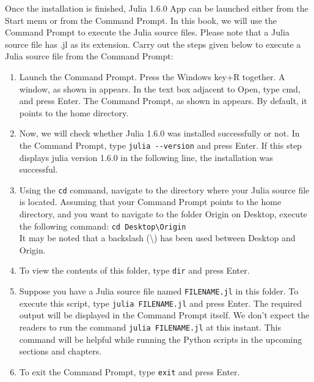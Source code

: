 Once the installation is finished, Julia 1.6.0 App can be launched either 
from the Start menu or from the Command Prompt. In this book, we will use the Command 
Prompt to execute the Julia source files. Please note that a Julia source file has .jl as its extension. 
Carry out the steps given below to execute a Julia source file from the Command Prompt:
\begin{enumerate}
      \item Launch the Command Prompt. Press the Windows key+R together. A window, as shown in  
      appears. In the text box adjacent to Open, type cmd, and press Enter. The Command Prompt, as shown in
        appears. By default, it points to the home directory.
      \item Now, we will check whether Julia 1.6.0 was installed successfully or not. 
      In the Command Prompt, type {\tt julia -{}-version} and press Enter. 
      If this step displays julia version 1.6.0 in the following line, the installation was successful.
      \item Using the {\tt cd} command, navigate to the directory where your Julia source file is located. 
      Assuming that your Command Prompt points to the 
      home directory, and you want to navigate to the folder Origin on 
      Desktop, execute the following command: {\tt cd Desktop\textbackslash Origin} \\
      It may be noted that a backslash (\textbackslash) has been used between 
      Desktop and Origin. 
      \item To view the contents of this folder, type {\tt dir} and press Enter.
      \item Suppose you have a Julia source file named {\tt FILENAME.jl} in this 
      folder. To execute this script, type {\tt julia FILENAME.jl} and press 
      Enter. The required output will be displayed in the Command Prompt itself. 
      We don't expect the readers to run the command {\tt julia FILENAME.jl} at 
      this instant. This command will be helpful while running the Python 
      scripts in the upcoming sections and chapters. 
      \item To exit the Command Prompt, type {\tt exit} and press Enter. 
\end{enumerate}

